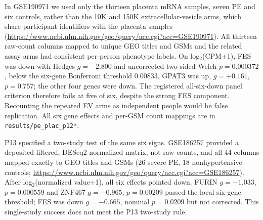 \documentclass[11pt,a4paper]{article}
\begin{document}
In GSE190971 we used only the thirteen placenta mRNA samples, seven PE and six controls, rather than the 10K and 150K extracellular-vesicle arms, which share participant identifiers with the placenta samples (\url{https://www.ncbi.nlm.nih.gov/geo/query/acc.cgi?acc=GSE190971}). All thirteen raw-count columns mapped to unique GEO titles and GSMs and the related assay arms had consistent per-person phenotype labels. On log$_2$(CPM+1), FES was down with Hedges $g=-2.800$ and uncorrected two-sided Welch $p=0.000372$, below the six-gene Bonferroni threshold $0.00833$. GPAT3 was up, $g=+0.161$, $p=0.757$; the other four genes were down. The registered all-six-down panel criterion therefore fails at five of six, despite the strong FES component. Recounting the repeated EV arms as independent people would be false replication. All six gene effects and per-GSM count mappings are in \texttt{results/pe\_plac\_p12*}.

P13 specified a two-study test of the same six signs. GSE186257 provided a deposited filtered, DESeq2-normalized matrix, not raw counts, and all 44 columns mapped exactly to GEO titles and GSMs (26 severe PE, 18 nonhypertensive controls; \url{https://www.ncbi.nlm.nih.gov/geo/query/acc.cgi?acc=GSE186257}). After log$_2$(normalized value+1), all six effects pointed down. FURIN $g=-1.033$, $p=0.000559$ and ZNF467 $g=-0.965$, $p=0.00209$ passed the local six-gene threshold; FES was down $g=-0.665$, nominal $p=0.0209$ but not corrected. This single-study success does not meet the P13 two-study rule.
\end{document}
